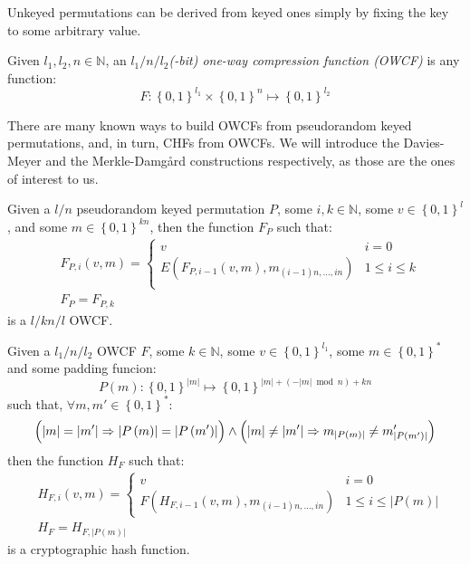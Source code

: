\noindent Unkeyed permutations can be derived from keyed ones simply by fixing the key to some
arbitrary value.
\begin{definition}
	Given \(l_1, l_2, n \in \mathbb{N}\), an \emph{\(l_1/n/l_2\)(-bit) one-way compression function
		(OWCF)}
	is any function:
	\[
		F\colon {\left\{0, 1\right\}}^{l_1} \times {\left\{0, 1\right\}}^n \mapsto
		{\left\{0, 1\right\}}^{l_2}
	\]
\end{definition}

\noindent There are many known ways to build OWCFs from pseudorandom keyed
permutations, and, in turn, CHFs from OWCFs.
We will introduce the Davies-Meyer and the Merkle-Damg\r{a}rd constructions respectively, as
those are the ones of interest to us.
\begin{theorem}
	Given a \(l/n\) pseudorandom keyed permutation \(P\), some \(i, k \in \mathbb{N}\), some
	\(v \in {\left\{0, 1\right\}}^l\), and some \(m \in {\left\{0, 1\right\}}^{kn}\), then the
	function \(F_P\) such that:
	\begin{align*}
		 & F_{P,i}\left(v, m\right) =
		\begin{cases}
			v                                                                         & i = 0
			\\
			E\left(F_{P, i-1}\left(v, m\right), m_{\left(i-1\right)n,\dots,in}\right) & 1 \le
			i \le k
			\\
		\end{cases} \\
		 & F_P = F_{P, k}
	\end{align*}
	is a \(l/kn/l\) OWCF\@.
\end{theorem}
\begin{theorem}
	Given a \(l_1/n/l_2\) OWCF \(F\), some \(k \in \mathbb{N}\), some
	\(v \in {\left\{0, 1\right\}}^{l_1}\), some \(m \in {\left\{0, 1\right\}}^*\) and some padding
	funcion:
	\[
		P\left(m\right)\colon {\left\{0, 1\right\}}^{\left|m\right|} \mapsto
		{\left\{0, 1\right\}}^{\left|m\right| + \left(-\left|m\right| \bmod n\right) + kn}
	\]
	such that, \(\forall m, m' \in {\left\{0, 1\right\}}^*\colon \)
	\[
		\Bigl(\left|m\right| = \left|m'\right| \Rightarrow \left|P\left(m\right)\right| =
		\left|P\left(m'\right)\right|\Bigr) \land
		\left(\left|m\right| \neq \left|m'\right| \Rightarrow m_{\left|P\left(m\right)\right|} \neq
		m'_{\left|P\left(m'\right)\right|}\right)
	\]
	then the function \(H_F\) such that:
	\begin{align*}
		 & H_{F, i}\left(v, m\right) =
		\begin{cases}
			v                                                                         & i = 0   \\
			F\left(H_{F, i-1}\left(v, m\right), m_{\left(i-1\right)n,\dots,in}\right) & 1 \le i
			\le \left|P\left(m\right)\right|
		\end{cases} \\
		 & H_F = H_{F, \left|P\left(m\right)\right|}
	\end{align*}
	is a cryptographic hash function.
\end{theorem}
